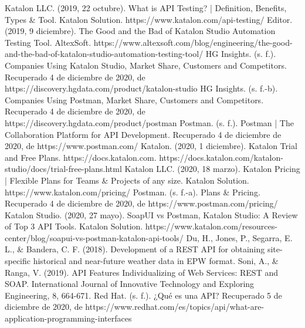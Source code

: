 \documentclass[twoside,twocolumn]{article}
\begin{document}
\begin{thebibliography}{99} 

\bibitem[1]{}
\newblock Katalon LLC. (2019, 22 octubre). What is API Testing? | Definition, Benefits, Types \& Tool. Katalon Solution. https://www.katalon.com/api-testing/
\bibitem[2]{}
\newblock Editor. (2019, 9 diciembre). The Good and the Bad of Katalon Studio Automation Testing Tool. AltexSoft. https://www.altexsoft.com/blog/engineering/the-good-and-the-bad-of-katalon-studio-automation-testing-tool/
\bibitem[3]{}
\newblock HG Insights. (s. f.). Companies Using Katalon Studio, Market Share, Customers and Competitors. Recuperado 4 de diciembre de 2020, de https://discovery.hgdata.com/product/katalon-studio
\bibitem[4]{}
\newblock HG Insights. (s. f.-b). Companies Using Postman, Market Share, Customers and Competitors. Recuperado 4 de diciembre de 2020, de https://discovery.hgdata.com/product/postman
\bibitem[5]{}
\newblock Postman. (s. f.). Postman | The Collaboration Platform for API Development. Recuperado 4 de diciembre de 2020, de https://www.postman.com/
\bibitem[6]{}
\newblock Katalon. (2020, 1 diciembre). Katalon Trial and Free Plans. https://docs.katalon.com. https://docs.katalon.com/katalon-studio/docs/trial-free-plans.html
\bibitem[7]{}
\newblock Katalon LLC. (2020, 18 marzo). Katalon Pricing | Flexible Plans for Teams \& Projects of any size. Katalon Solution. https://www.katalon.com/pricing/
\bibitem[8]{}
\newblock Postman. (s. f.-a). Plans \& Pricing. Recuperado 4 de diciembre de 2020, de https://www.postman.com/pricing/
\bibitem[9]{}
\newblock Katalon Studio. (2020, 27 mayo). SoapUI vs Postman, Katalon Studio: A Review of Top 3 API Tools. Katalon Solution. https://www.katalon.com/resources-center/blog/soapui-vs-postman-katalon-api-tools/
\bibitem[10]{}
\newblock Du, H., Jones, P., Segarra, E. L., \& Bandera, C. F. (2018). Development of a REST API for obtaining site-specific historical and near-future weather data in EPW format.
\bibitem[11]{}
\newblock Soni, A., \& Ranga, V. (2019). API Features Individualizing of Web Services: REST and SOAP. International Journal of Innovative Technology and Exploring Engineering, 8, 664-671.
\bibitem[12]{}
\newblock Red Hat. (s. f.). ¿Qué es una API? Recuperado 5 de diciembre de 2020, de https://www.redhat.com/es/topics/api/what-are-application-programming-interfaces
\end{thebibliography}

\end{document}
